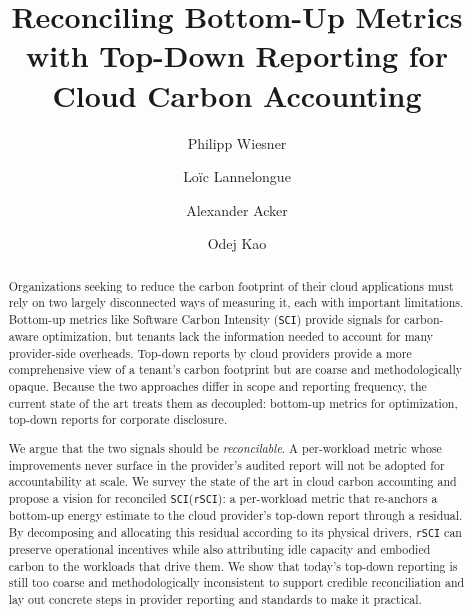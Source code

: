 \documentclass[sigconf,screen,nonacm]{acmart}
\newcommand{\SCI}{\texttt{SCI}\xspace}
\newcommand{\RSCI}{\texttt{rSCI}\xspace}
\begin{document}
\title{Reconciling Bottom-Up Metrics with Top-Down Reporting for Cloud Carbon Accounting}

\author{Philipp Wiesner}

\author{Loïc Lannelongue}

\author{Alexander Acker}

\author{Odej Kao}


\begin{abstract}
Organizations seeking to reduce the carbon footprint of their cloud applications must rely on two largely disconnected ways of measuring it, each with important limitations.
Bottom-up metrics like Software Carbon Intensity (\SCI) provide signals for carbon-aware optimization, but tenants lack the information needed to account for many provider-side overheads.
Top-down reports by cloud providers provide a more comprehensive view of a tenant's carbon footprint but are coarse and methodologically opaque.
Because the two approaches differ in scope and reporting frequency, the current state of the art treats them as decoupled: bottom-up metrics for optimization, top-down reports for corporate disclosure.

We argue that the two signals should be \emph{reconcilable}.
A per-work\-load metric whose improvements never surface in the provider's audited report will not be adopted for accountability at scale.
We survey the state of the art in cloud carbon accounting and propose a vision for reconciled \SCI (\RSCI): a per-workload metric that re-anchors a bottom-up energy estimate to the cloud provider's top-down report through a residual.
By decomposing and allocating this residual according to its physical drivers, \RSCI can preserve operational incentives while also attributing idle capacity and embodied carbon to the workloads that drive them.
We show that today's top-down reporting is still too coarse and methodologically inconsistent to support credible reconciliation and lay out concrete steps in provider reporting and standards to make it practical.
\end{abstract}

\maketitle
\end{document}
